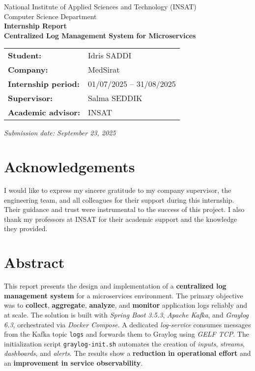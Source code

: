 \documentclass[12pt,a4paper]{report}
\begin{document}
\begin{titlepage}
    \centering
    {\Large National Institute of Applied Sciences and Technology (INSAT)\\[0.25cm]}
    {\large Computer Science Department\\[1.2cm]}
    {\LARGE \textbf{Internship Report}}\\[0.6cm]
    {\Large \textbf{Centralized Log Management System for Microservices}}\\[1.2cm]

  \begin{tabular}{>{\bfseries}p{5cm} p{9cm}}
    Student: & Idris SADDI \\
    Company: & MedSirat \\
    Internship period: & 01/07/2025 -- 31/08/2025 \\
    Supervisor: & Salma SEDDIK \\
    Academic advisor: & INSAT \\
  \end{tabular}

    \vfill

    \vfill
    \large \textit{Submission date: September 23, 2025}
\end{titlepage}

\chapter*{Acknowledgements}
I would like to express my sincere gratitude to my company supervisor, the engineering team, and all colleagues for their support during this internship. Their guidance and trust were instrumental to the success of this project. I also thank my professors at INSAT for their academic support and the knowledge they provided.

\tableofcontents
\listoffigures
\listoftables
\clearpage
{}

\chapter*{Abstract}
This report presents the design and implementation of a \textbf{centralized log management system} for a microservices environment. The primary objective was to \textbf{collect}, \textbf{aggregate}, \textbf{analyze}, and \textbf{monitor} application logs reliably and at scale. The solution is built with \textit{Spring Boot 3.5.3}, \textit{Apache Kafka}, and \textit{Graylog 6.3}, orchestrated via \textit{Docker Compose}. A dedicated \textit{log-service} consumes messages from the Kafka topic \texttt{logs} and forwards them to Graylog using \textit{GELF TCP}. The initialization script \texttt{graylog-init.sh} automates the creation of \textit{inputs}, \textit{streams}, \textit{dashboards}, and \textit{alerts}. The results show a \textbf{reduction in operational effort} and an \textbf{improvement in service observability}.
\end{document}
